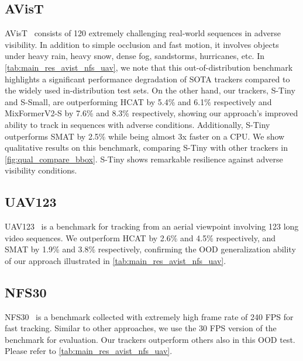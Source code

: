   \subsection{AVisT} 
  AVisT~\cite{noman2022avist} consists of 120 extremely challenging real-world sequences in adverse visibility.
  In addition to simple occlusion and fast motion, it involves objects under heavy rain, heavy snow, dense fog, sandstorms, hurricanes, etc. In \ref{tab:main_res_avist_nfs_uav}, we note that this out-of-distribution benchmark highlights a significant performance degradation of SOTA trackers compared to the widely used in-distribution test sets. On the other hand, our trackers, S-Tiny and S-Small, are outperforming HCAT by 5.4\% and 6.1\% respectively and MixFormerV2-S\cite{cui2024mixformerv2} by 7.6\% and 8.3\% respectively, showing our approach's improved ability to track in sequences with adverse conditions. Additionally, S-Tiny outperforms SMAT\cite{gopal2024separable} by 2.5\% while being almost 3x faster on a CPU. We show qualitative results on this benchmark, comparing S-Tiny with other trackers in \ref{fig:qual_compare_bbox}. S-Tiny shows remarkable resilience against adverse visibility conditions. 
  
  \subsection{UAV123}
  UAV123~\cite{mueller2016benchmark}  is a benchmark for tracking from an aerial viewpoint involving 123 long video sequences. We outperform HCAT by 2.6\% and 4.5\% respectively, and SMAT by 1.9\% and 3.8\% respectively, confirming the OOD generalization ability of our approach illustrated in \ref{tab:main_res_avist_nfs_uav}.


  \subsection{NFS30}
  NFS30~\cite{kiani2017need}  is a benchmark collected with extremely high frame rate of 240 FPS for fast tracking. Similar to other approaches, we use the 30 FPS version of the benchmark for evaluation. Our trackers outperform others also in this OOD test. Please refer to \ref{tab:main_res_avist_nfs_uav}.
  
